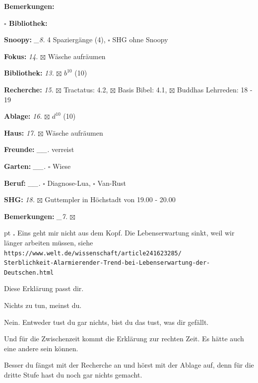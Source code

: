 \documentclass[10pt,a4paper]{article}
\newcounter{notec}
\newcommand\notep[1]{%
  \stepcounter{notec}
  \vskip #1pt
  {\bf\arabic{notec}.}
}
\newcommand\prop[1] {{\color {alizarin} {\bf #1}}}             %
\newcommand\mand[1] {{\color {burntorange} {\bf #1}}}          %
\newcommand\bottomspace{\vskip 4pt}
\newcommand\n[1] { {\sl #1.} \hskip 5pt }
\begin{document}
\begin{mdframed}[style=daystyle]
\begin{labeling}{{\mand {Bemerkungen:}}}
\begin{minipage}{0.75\textwidth}
\begin{labeling}{\prop {$\square$ {Bibliothek:}}}
      \end{labeling}
    \end{minipage}
    \bottomspace
  \item[{\mand {Snoopy:}}]        \n{\_8} 4 Spaziergänge (4), $\square$ SHG ohne Snoopy
  \item[{\mand {Fokus:}}]          \n{14} $\boxtimes$ Wäsche aufräumen
  \item[{\mand {Bibliothek:}}]     \n{13} $\boxtimes$ $b^{10}$ (10)
  \item[{\mand {Recherche:}}]      \n{15} $\boxtimes$ Tractatus: 4.2, $\boxtimes$ Basis Bibel: 4.1,
      $\boxtimes$ Buddhas Lehrreden: 18 - 19    
  \item[{\mand {Ablage:}}]         \n{16} $\boxtimes$ $d^{10}$ (10)
  \item[{\mand {Haus:}}]           \n{17} $\boxtimes$ Wäsche aufräumen
  \item[{\mand {Freunde:}}]      \n{\_\_} verreist
  \item[{\mand {Garten:}}]       \n{\_\_} $\square$ Wiese
  \item[{\mand {Beruf:}}]        \n{\_\_} $\square$ Diagnose-Lua, $\square$ Van-Rust
  \item[{\mand {SHG:}}]            \n{18} $\boxtimes$ Guttempler in Höchstadt von 19.00 - 20.00
  \item[{\mand {Bemerkungen:}}]   \n{\_7} $\boxtimes$
  \end{labeling}
    
  \setcounter{notec}{0}
  
  \notep 0 Eins geht mir nicht aus dem Kopf. Die Lebenserwartung sinkt, weil wir
  länger arbeiten müssen, siehe \\
  \verb+https://www.welt.de/wissenschaft/article241623285/+ \\
  \verb+Sterblichkeit-Alarmierender-Trend-bei-Lebenserwartung-der-Deutschen.html+

  \vskip 2pt
  Diese Erklärung passt dir.

  \vskip 2pt
  Nichts zu tun, meinst du.

  \vskip 2pt
  Nein. Entweder tust du gar nichts, bist du das tust, was dir gefällt.

  \vskip 2pt
  Und für die Zwischenzeit kommt die Erklärung zur rechten Zeit. Es hätte auch
  eine andere sein können.

  \vskip 2pt
  Besser du fängst mit der Recherche an und hörst mit der Ablage auf, denn für die
  dritte Stufe hast du noch gar nichts gemacht.



\end{mdframed}
\end{document}
